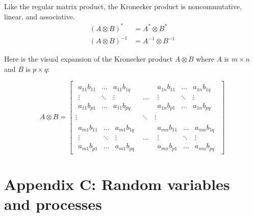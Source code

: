 \documentclass[a4paper, 12pt]{book}
\begin{document}
Like the regular matrix product, the Kronecker product is noncommutative, linear, and associative.
\begin{align}
    (A \otimes B)^{*} &= A^{*} \otimes B^{*} \tag{B.36} \\
    (A \otimes B)^{-1} &= A^{-1} \otimes B^{-1} \tag{B.37}
\end{align}

\begin{purplebox}
Here is the visual expansion of the Kronecker product $A \otimes B$ where $A$ is $m \times n$ and $B$ is $p \times q$:

\begin{equation*}
A \otimes B = 
\left[
\begin{array}{c|c|c}
  \begin{matrix} 
    a_{11}b_{11} & \dots & a_{11}b_{1q} \\ 
    \vdots & \ddots & \vdots \\ 
    a_{11}b_{p1} & \dots & a_{11}b_{pq} 
  \end{matrix} & \dots & \begin{matrix} 
    a_{1n}b_{11} & \dots & a_{1n}b_{1q} \\ 
    \vdots & \ddots & \vdots \\ 
    a_{1n}b_{p1} & \dots & a_{1n}b_{pq} 
  \end{matrix} \\
  \hline
  \vdots & \ddots & \vdots \\
  \hline
  \begin{matrix} 
    a_{m1}b_{11} & \dots & a_{m1}b_{1q} \\ 
    \vdots & \ddots & \vdots \\ 
    a_{m1}b_{p1} & \dots & a_{m1}b_{pq} 
  \end{matrix} & \dots & \begin{matrix} 
    a_{mn}b_{11} & \dots & a_{mn}b_{1q} \\ 
    \vdots & \ddots & \vdots \\ 
    a_{mn}b_{p1} & \dots & a_{mn}b_{pq} 
  \end{matrix}
\end{array}
\right]
\end{equation*}
\end{purplebox}


\setcounter{chapter}{3}
\setcounter{section}{0}
\chapter*{Appendix C: Random variables and processes}
\end{document}
